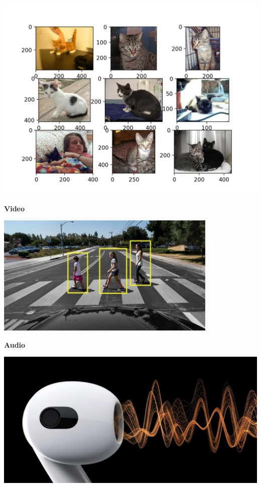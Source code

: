 \documentclass[
  letterpaper,
  DIV=11,
  numbers=noendperiod]{scrartcl}
\begin{document}
\includegraphics[width=5.48958in,height=\textheight]{images/clipboard-3296722573.png}

{\textbf{Video}}

\includegraphics[width=4.17708in,height=\textheight]{images/clipboard-2123600827.png}

{\textbf{Audio}}

\includegraphics{images/clipboard-2206237365.png}
\end{document}
